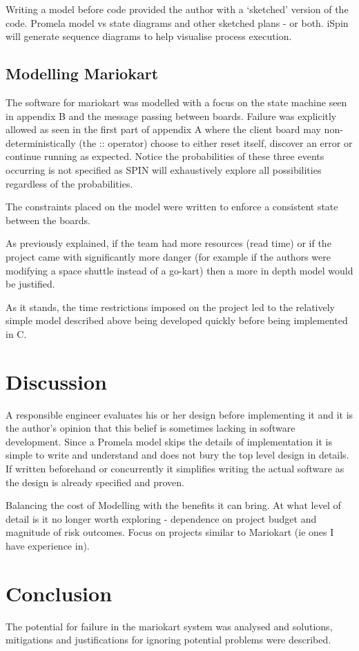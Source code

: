 Writing a model before code provided the author with a `sketched' version of 
the code. 
Promela model vs state diagrams and other sketched plans - or both. iSpin will
 generate sequence diagrams to help visualise process execution.

\subsection{Modelling Mariokart}
The software for mariokart was modelled with a focus on the state machine seen in 
appendix B and the message passing between boards. Failure was explicitly allowed
as seen in the first part of appendix A where the client board may non-deterministically
(the :: operator) choose to either reset itself, discover an error or continue running as
expected. Notice the probabilities of these three events occurring is not specified
as SPIN will exhaustively explore all possibilities regardless of the probabilities.

The constraints placed on the model were written to enforce a consistent state between
the boards. 

As previously explained, if the team had more resources (read time) or if the
project came with significantly more danger (for example if the authors were modifying
a space shuttle instead of a go-kart) then a more in depth model would be justified.

As it stands, the time restrictions imposed on the project led to the relatively simple
model described above being developed quickly before being implemented in C.


\section{Discussion}
A responsible engineer evaluates his or her design before implementing it and it is the author's opinion 
that this belief is sometimes lacking in software development. Since a Promela model skips
the details of implementation it is simple to write and understand and does not bury the top level design 
in details. If written beforehand or concurrently it  simplifies writing the actual software 
as the design is already specified and proven.

Balancing the cost of Modelling with the benefits it can bring. At what level of detail is it no longer worth 
exploring - dependence on project budget and magnitude of risk outcomes. Focus on projects similar to
Mariokart (ie ones I have experience in).

\section{Conclusion}
The potential for failure in the mariokart system was analysed and solutions, mitigations and justifications
for ignoring potential problems were described. 
